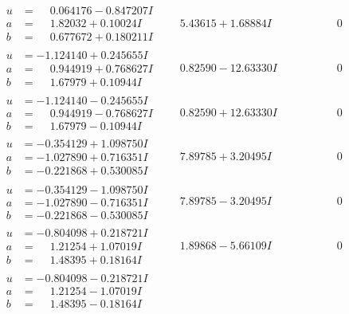 \documentclass[1p]{elsarticle_modified}
\theoremstyle{definition}
\begin{document}
$$\begin{array}{c|c|c}
\begin{aligned}
u &= \phantom{-}0.064176 - 0.847207 I \\
a &= \phantom{-}1.82032 + 0.10024 I \\
b &= \phantom{-}0.677672 + 0.180211 I\end{aligned}
 & \phantom{-}5.43615 + 1.68884 I & \phantom{-0.000000 } 0 \\ \hline\begin{aligned}
u &= -1.124140 + 0.245655 I \\
a &= \phantom{-}0.944919 + 0.768627 I \\
b &= \phantom{-}1.67979 + 0.10944 I\end{aligned}
 & \phantom{-}0.82590 - 12.63330 I & \phantom{-0.000000 } 0 \\ \hline\begin{aligned}
u &= -1.124140 - 0.245655 I \\
a &= \phantom{-}0.944919 - 0.768627 I \\
b &= \phantom{-}1.67979 - 0.10944 I\end{aligned}
 & \phantom{-}0.82590 + 12.63330 I & \phantom{-0.000000 } 0 \\ \hline\begin{aligned}
u &= -0.354129 + 1.098750 I \\
a &= -1.027890 + 0.716351 I \\
b &= -0.221868 + 0.530085 I\end{aligned}
 & \phantom{-}7.89785 + 3.20495 I & \phantom{-0.000000 } 0 \\ \hline\begin{aligned}
u &= -0.354129 - 1.098750 I \\
a &= -1.027890 - 0.716351 I \\
b &= -0.221868 - 0.530085 I\end{aligned}
 & \phantom{-}7.89785 - 3.20495 I & \phantom{-0.000000 } 0 \\ \hline\begin{aligned}
u &= -0.804098 + 0.218721 I \\
a &= \phantom{-}1.21254 + 1.07019 I \\
b &= \phantom{-}1.48395 + 0.18164 I\end{aligned}
 & \phantom{-}1.89868 - 5.66109 I & \phantom{-0.000000 } 0 \\ \hline\begin{aligned}
u &= -0.804098 - 0.218721 I \\
a &= \phantom{-}1.21254 - 1.07019 I \\
b &= \phantom{-}1.48395 - 0.18164 I\end{aligned}

\end{array}$$
\end{document}
